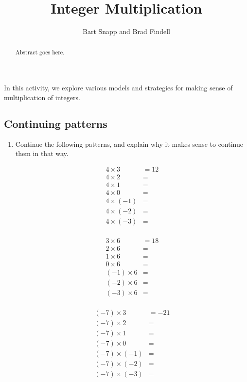 \documentclass{ximera}
\title{Integer Multiplication}
\author{Bart Snapp and Brad Findell}
\begin{document}
\begin{abstract}
Abstract goes here.  
\end{abstract}
\maketitle

\label{A:integerMultiplication}

In this activity, we explore various models and strategies for 
making sense of multiplication of integers.  

\subsection*{Continuing patterns}
\begin{problem}
\begin{enumerate}
\item Continue the following patterns, and explain why it makes sense to continue them in that way.    


\begin{minipage}{0.45\textwidth}
\begin{align*}
4\times 3 &= 12 \\
4\times 2 &= \\
4\times 1 &= \\
4\times 0 &= \\
4\times (-1) &= \\
4\times (-2) &= \\
4\times (-3) &= \\
\end{align*}
\end{minipage}
\begin{minipage}{0.45\textwidth}
\begin{align*}
3\times 6 &= 18 \\
2\times 6 &= \\
1\times 6 &= \\
0\times 6 &= \\
(-1)\times 6 &= \\
(-2)\times 6 &= \\
(-3)\times 6 &= \\
\end{align*}
\end{minipage}
\begin{minipage}{0.45\textwidth}
\begin{align*}
(-7)\times 3 &= -21 \\
(-7)\times 2 &= \\
(-7)\times 1 &= \\
(-7)\times 0 &= \\
(-7)\times (-1) &= \\
(-7)\times (-2) &= \\
(-7)\times (-3) &= \\
\end{align*}
\end{minipage}


\end{enumerate}
\end{problem}
\end{document}
